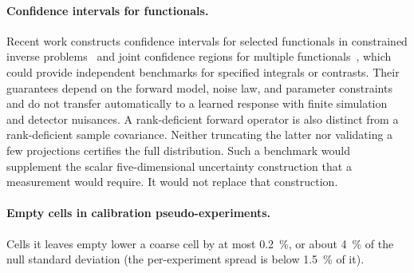 \paragraph{Confidence intervals for functionals.} Recent work constructs confidence intervals for selected functionals in constrained inverse problems~\cite{Stanley:2025functionals} and joint confidence regions for multiple functionals~\cite{Batlle:2025simultaneous}, which could provide independent benchmarks for specified integrals or contrasts. Their guarantees depend on the forward model, noise law, and parameter constraints and do not transfer automatically to a learned response with finite simulation and detector nuisances. A rank-deficient forward operator is also distinct from a rank-deficient sample covariance. Neither truncating the latter nor validating a few projections certifies the full distribution. Such a benchmark would supplement the scalar five-dimensional uncertainty construction that a measurement would require. It would not replace that construction.

\paragraph{Empty cells in calibration pseudo-experiments.} Cells it leaves empty lower a coarse cell by at most \SI{0.2}{\percent}, or about \SI{4}{\percent} of the null standard deviation (the per-experiment spread is below \SI{1.5}{\percent} of it).

